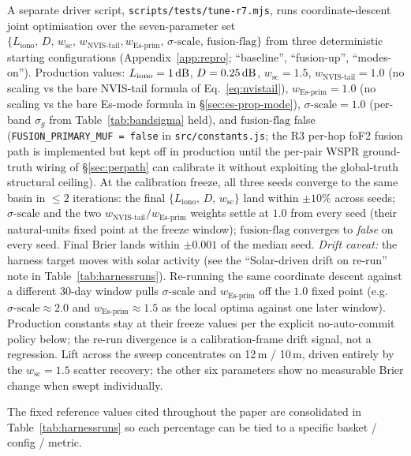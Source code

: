 \documentclass[11pt,a4paper]{article}
\newcommand{\SI}[2]{#1\,\text{#2}}
\newcommand{\dB}{\text{dB}}
\begin{document}
A separate driver script,
\texttt{scripts/tests/tune-r7.mjs}, runs coordinate-descent
joint optimisation over the seven-parameter set
$\{L_{\text{iono}},\,D,\,w_{\text{sc}},\,w_{\text{NVIS-tail}},
w_{\text{Es-prim}},\,\sigma\text{-scale},\,\text{fusion-flag}\}$
from three deterministic starting configurations
(Appendix~\ref{app:repro}; ``baseline'', ``fusion-up'',
``modes-on'').  Production values: $L_{\text{iono}} =
\SI{1}{\dB}$, $D = \SI{0.25}{\dB}$, $w_{\text{sc}} = 1.5$,
$w_{\text{NVIS-tail}} = 1.0$ (no scaling vs the bare NVIS-tail
formula of Eq.~\ref{eq:nvistail}),
$w_{\text{Es-prim}} = 1.0$ (no scaling vs the bare Es-mode
formula in \S\ref{sec:es-prop-mode}), $\sigma\text{-scale} = 1.0$
(per-band $\sigma_g$ from Table~\ref{tab:bandsigma} held), and
$\text{fusion-flag}$ false (\texttt{FUSION\_PRIMARY\_MUF =
false} in \texttt{src/constants.js}; the R3 per-hop foF2 fusion
path is implemented but kept off in production until the
per-pair WSPR ground-truth wiring of \S\ref{sec:perpath} can
calibrate it without exploiting the global-truth structural
ceiling).  At the calibration freeze, all three
seeds converge to the same basin in $\leq 2$ iterations: the
final $\{L_{\text{iono}},\,D,\,w_{\text{sc}}\}$ land within
$\pm 10\%$ across seeds; $\sigma\text{-scale}$ and the two
$w_{\text{NVIS-tail}} / w_{\text{Es-prim}}$ weights settle at
$1.0$ from every seed (their natural-units
fixed point at the freeze window); $\text{fusion-flag}$ converges to
\emph{false} on every seed.  Final Brier lands within
$\pm 0.001$ of the median seed.  \emph{Drift caveat:} the
harness target moves with solar activity (see
the ``Solar-driven drift on re-run'' note in
Table~\ref{tab:harnessruns}).  Re-running the same coordinate
descent against a different 30-day window pulls
$\sigma\text{-scale}$ and $w_{\text{Es-prim}}$ off the $1.0$
fixed point (e.g.\ $\sigma\text{-scale}
\approx 2.0$ and $w_{\text{Es-prim}} \approx 1.5$ as the local
optima against one later window).  Production constants stay at
their freeze values per the explicit no-auto-commit
policy below; the re-run divergence is a calibration-frame
drift signal, not a regression.  Lift across the sweep
concentrates on 12\,m / 10\,m, driven entirely by the
$w_{\text{sc}} = 1.5$ scatter recovery; the other six
parameters show no measurable Brier change
when swept individually.

The fixed reference values cited throughout the paper are
consolidated in Table~\ref{tab:harnessruns} so each percentage can
be tied to a specific basket / config / metric.
\end{document}
